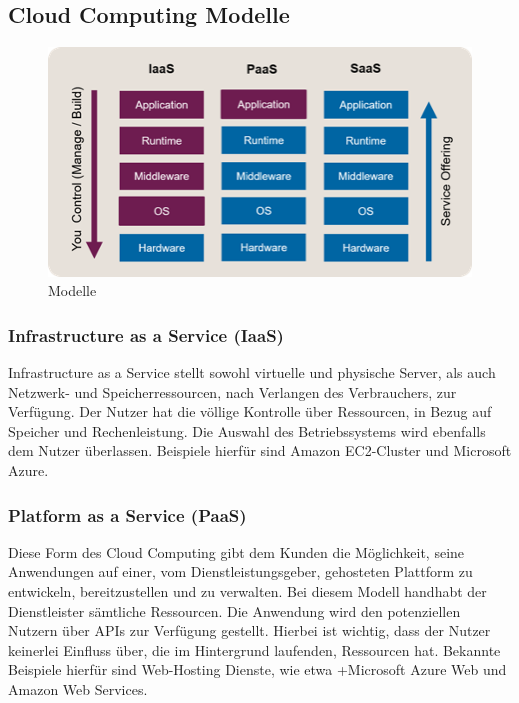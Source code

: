 \subsection{Cloud Computing Modelle}

\begin{figure}[h]
    \centering
    \includegraphics[scale=0.9]{sections/cloud-computing/images/models.png}
    \caption{Modelle}
    \label{fig:kimldl-comparison}
\end{figure}

\subsubsection{Infrastructure as a Service (IaaS)}

Infrastructure as a Service stellt sowohl virtuelle und physische Server, als auch Netzwerk- und Speicherressourcen, nach Verlangen des Verbrauchers, zur Verfügung. Der Nutzer hat die völlige Kontrolle über Ressourcen, in Bezug auf Speicher und Rechenleistung. Die Auswahl des Betriebssystems wird ebenfalls dem Nutzer überlassen. Beispiele hierfür sind Amazon EC2-Cluster und Microsoft Azure.

\subsubsection{Platform as a Service (PaaS)}

Diese Form des Cloud Computing gibt dem Kunden die Möglichkeit, seine Anwendungen auf einer, vom Dienstleistungsgeber, gehosteten Plattform zu entwickeln, bereitzustellen und zu verwalten. Bei diesem Modell handhabt der Dienstleister sämtliche Ressourcen. Die Anwendung wird den potenziellen Nutzern über APIs zur Verfügung gestellt. Hierbei ist wichtig, dass der Nutzer keinerlei Einfluss über, die im Hintergrund laufenden, Ressourcen hat. Bekannte Beispiele hierfür sind Web-Hosting Dienste, wie etwa +Microsoft Azure Web und Amazon Web Services.

